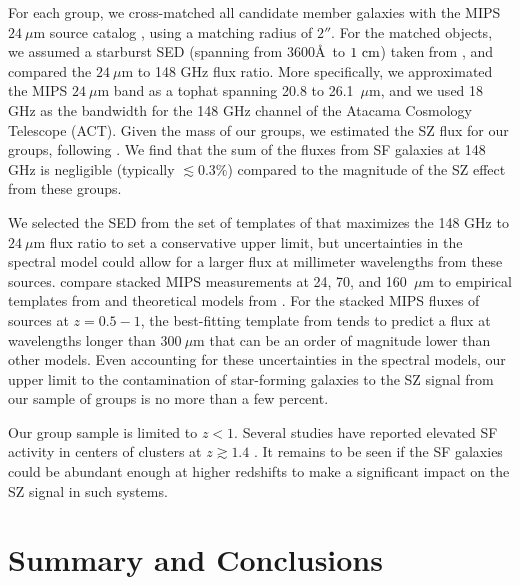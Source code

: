 For each group, we cross-matched all candidate member galaxies with the MIPS
$24~\mu$m source catalog \citep{Sanders2007,LeFloch2009}, using a matching radius of $2''$.  For the
matched objects, we assumed a starburst SED (spanning from $3600$\AA\ to $1~\rm{cm}$)
taken from \citet{Lagache2003}, and compared the $24~\mu$m to 148 GHz flux ratio.
More specifically, we approximated the MIPS $24~\mu$m band as a tophat spanning
20.8 to 26.1~$\mu$m, and we used 18 GHz as the bandwidth for the 148 GHz
channel of the Atacama Cosmology Telescope (ACT).  Given the mass of
our groups, we estimated the SZ flux for our 
groups, following \citet{Majumdar2004}. We find that the sum of the fluxes from SF
galaxies at 148 GHz is negligible (typically $\lesssim 0.3\%$) compared to the magnitude of the SZ
effect from these groups. 

We selected the SED from the set of templates of \citet{Lagache2003}
that maximizes the 148 GHz to $24~\mu$m flux ratio to set a
conservative upper limit, but uncertainties in the spectral model
could allow for a larger flux at millimeter wavelengths from these
sources. \citet{Lee2010} compare stacked MIPS measurements at 24, 
70, and 160~$\mu$m to empirical templates from \citet{Chary2001,
  Dale2002, Lagache2003} and theoretical models from
\citet{Siebenmorgen2007}. For the stacked MIPS fluxes of sources at
$z=0.5-1$, the best-fitting template from \citet{Lagache2003} tends to
predict a flux at wavelengths longer than $300~\mu$m that can be an order of
magnitude lower than other models. Even accounting for these uncertainties
in the spectral models, our upper limit to the contamination of
star-forming galaxies to the SZ signal from our sample of groups is no
more than a few percent.

Our group sample is limited to $z<1$.  Several studies have reported
elevated SF activity in centers of clusters at $z\gtrsim 1.4$ \citep[e.g.,
][]{Hilton2010,Tran2010,Tanaka2010}.  It remains to be seen if the SF galaxies could
be abundant enough at higher redshifts to make a significant impact on
the SZ signal in such systems.



\section{Summary and Conclusions}
\label{cat_s:conclusion}

